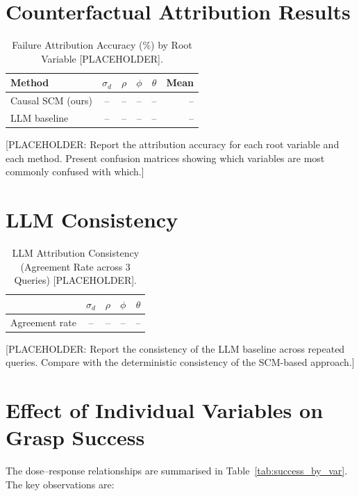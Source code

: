\documentclass[11pt,a4paper]{report}
\begin{document}
\section{Counterfactual Attribution Results}

\begin{table}[t]
  \caption{Failure Attribution Accuracy (\%) by Root Variable [PLACEHOLDER].}
  \label{tab:attribution}
  \centering
  \begin{tabular}{lccccr}
    \toprule
    \textbf{Method}
      & $\sigma_d$ & $\rho$ & $\phi$ & $\theta$ & \textbf{Mean} \\
    \midrule
    Causal SCM (ours) & -- & -- & -- & -- & -- \\
    LLM baseline      & -- & -- & -- & -- & -- \\
    \bottomrule
  \end{tabular}
\end{table}

[PLACEHOLDER: Report the attribution accuracy for each root variable and each method. Present confusion matrices showing which variables are most commonly confused with which.]

\section{LLM Consistency}

\begin{table}[t]
  \caption{LLM Attribution Consistency (Agreement Rate across 3 Queries) [PLACEHOLDER].}
  \label{tab:consistency}
  \centering
  \begin{tabular}{lcccc}
    \toprule
    & $\sigma_d$ & $\rho$ & $\phi$ & $\theta$ \\
    \midrule
    Agreement rate & -- & -- & -- & -- \\
    \bottomrule
  \end{tabular}
\end{table}

[PLACEHOLDER: Report the consistency of the LLM baseline across repeated queries. Compare with the deterministic consistency of the SCM-based approach.]

\section{Effect of Individual Variables on Grasp Success}
\label{sec:dose_response}

The dose--response relationships are summarised in Table~\ref{tab:success_by_var}. The key observations are:
\end{document}
